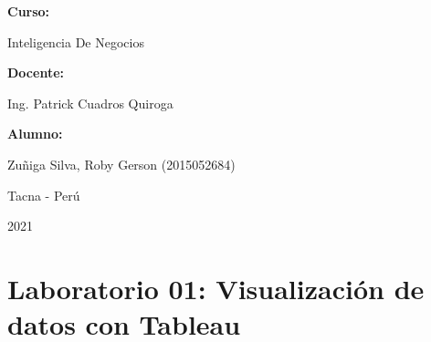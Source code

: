 \documentclass[12pt,letterpaper]{article}
\begin{document}
\begin{titlepage}
\begin{center}
\vspace*{0.3in}
\begin{Large}
\textbf{Curso:} \\
\end{Large}

\vspace*{0.1in}
\begin{large}
    Inteligencia De Negocios\\
\end{large}

\vspace*{0.3in}
\begin{Large}
\textbf{Docente:} \\
\end{Large}

\vspace*{0.1in}
\begin{large}
Ing. Patrick Cuadros Quiroga\\
\end{large}

\vspace*{0.2in}
\vspace*{0.1in}
\begin{large}
\textbf{Alumno:} \\
\begin{flushleft}
 Zuñiga Silva, Roby Gerson		\hfill	(2015052684) \\


\end{flushleft}
\end{large}
\vspace*{0.1in}
\begin{large}
Tacna - Perú\\
\end{large}
\vspace*{0.1in}
\begin{large}
2021\\
\end{large}

\end{center}

\end{titlepage}



\tableofcontents %
\thispagestyle{empty} %
\newpage
\setcounter{page}{1} %



\section*{Laboratorio 01: Visualización de datos con Tableau}
\end{document}
